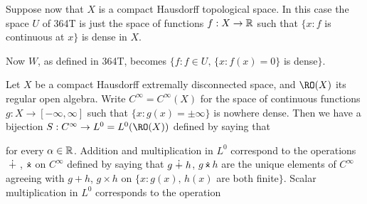  Suppose now that $X$ is a compact
Hausdorff topological space.
In this case the space $U$ of 364T is just the space of functions
$f:X\to\Bbb R$ such that $\{x:f$ is continuous at $x\}$ is dense in $X$.

Now $W$, as defined in 364T,
becomes $\{f:f\in U,\,\{x:f(x)=0\}$ is dense$\}$.   



 Let $X$ be a compact Hausdorff extremally
disconnected space, and $\RO(X)$ its regular open algebra.   Write
$C^{\infty}=C^{\infty}(X)$ for the space of continuous functions
$g:X\to[-\infty,\infty]$ such that $\{x:g(x)=\pm\infty\}$ is nowhere
dense.   Then we have a bijection $S:C^{\infty}\to L^0=L^0(\RO(X))$
defined by saying that


\noindent for every $\alpha\in\Bbb R$.   Addition and multiplication in
$L^0$ correspond to the operations $\mskip5mu\dot+\mskip5mu$, $\dottimes$ on
$C^{\infty}$ defined by saying that $g\mskip5mu\dot+\mskip5mu h$, $g\dottimes h$ are
the unique elements of $C^{\infty}$ agreeing with $g+h$, $g\times h$ on
$\{x:g(x),\,h(x)$ are both finite$\}$.   Scalar multiplication in $L^0$
corresponds to the operation


